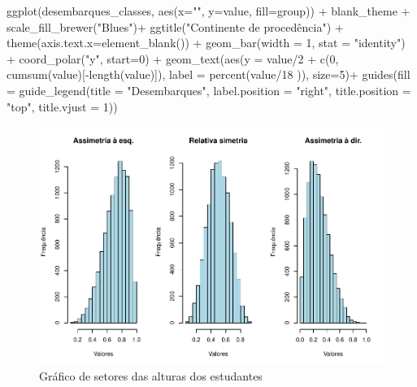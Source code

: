 \documentclass[
]{book}
\newenvironment{Shaded}{\begin{snugshade}}{\end{snugshade}}
\newcommand{\AttributeTok}[1]{\textcolor[rgb]{0.77,0.63,0.00}{#1}}
\newcommand{\DecValTok}[1]{\textcolor[rgb]{0.00,0.00,0.81}{#1}}
\newcommand{\FunctionTok}[1]{\textcolor[rgb]{0.00,0.00,0.00}{#1}}
\newcommand{\NormalTok}[1]{#1}
\newcommand{\SpecialCharTok}[1]{\textcolor[rgb]{0.00,0.00,0.00}{#1}}
\newcommand{\StringTok}[1]{\textcolor[rgb]{0.31,0.60,0.02}{#1}}
\begin{document}
\begin{Shaded}
\begin{Highlighting}[]
\FunctionTok{ggplot}\NormalTok{(desembarques\_classes, }\FunctionTok{aes}\NormalTok{(}\AttributeTok{x=}\StringTok{""}\NormalTok{, }\AttributeTok{y=}\NormalTok{value, }\AttributeTok{fill=}\NormalTok{group)) }\SpecialCharTok{+}
\NormalTok{  blank\_theme }\SpecialCharTok{+}
  \FunctionTok{scale\_fill\_brewer}\NormalTok{(}\StringTok{"Blues"}\NormalTok{)}\SpecialCharTok{+}
  \FunctionTok{ggtitle}\NormalTok{(}\StringTok{"Continente de procedência"}\NormalTok{) }\SpecialCharTok{+}
  \FunctionTok{theme}\NormalTok{(}\AttributeTok{axis.text.x=}\FunctionTok{element\_blank}\NormalTok{()) }\SpecialCharTok{+}
  \FunctionTok{geom\_bar}\NormalTok{(}\AttributeTok{width =} \DecValTok{1}\NormalTok{, }\AttributeTok{stat =} \StringTok{"identity"}\NormalTok{) }\SpecialCharTok{+}
  \FunctionTok{coord\_polar}\NormalTok{(}\StringTok{"y"}\NormalTok{, }\AttributeTok{start=}\DecValTok{0}\NormalTok{) }\SpecialCharTok{+}
  \FunctionTok{geom\_text}\NormalTok{(}\FunctionTok{aes}\NormalTok{(}\AttributeTok{y =}\NormalTok{ value}\SpecialCharTok{/}\DecValTok{2} \SpecialCharTok{+} \FunctionTok{c}\NormalTok{(}\DecValTok{0}\NormalTok{, }\FunctionTok{cumsum}\NormalTok{(value)[}\SpecialCharTok{{-}}\FunctionTok{length}\NormalTok{(value)]),}
                \AttributeTok{label =} \FunctionTok{percent}\NormalTok{(value}\SpecialCharTok{/}\DecValTok{18}\NormalTok{ )), }\AttributeTok{size=}\DecValTok{5}\NormalTok{)}\SpecialCharTok{+}
  \FunctionTok{guides}\NormalTok{(}\AttributeTok{fill =} \FunctionTok{guide\_legend}\NormalTok{(}\AttributeTok{title =} \StringTok{"Desembarques"}\NormalTok{,}
                             \AttributeTok{label.position =} \StringTok{"right"}\NormalTok{,}
                             \AttributeTok{title.position =} \StringTok{"top"}\NormalTok{, }\AttributeTok{title.vjust =} \DecValTok{1}\NormalTok{)) }
\end{Highlighting}
\end{Shaded}

\begin{figure}
\centering
\includegraphics{apostila_files/figure-latex/unnamed-chunk-40-1.pdf}
\caption{\label{fig:unnamed-chunk-40}Gráfico de setores das alturas dos estudantes}
\end{figure}
\end{document}
